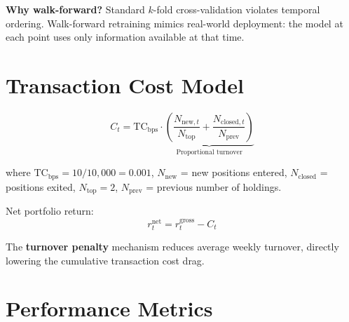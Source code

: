 \documentclass[12pt,a4paper]{article}
\begin{document}
\textbf{Why walk-forward?} Standard $k$-fold cross-validation violates temporal ordering. Walk-forward retraining mimics real-world deployment: the model at each point uses only information available at that time.

\section{Transaction Cost Model}

\begin{equation}
    C_t = \text{TC}_{\text{bps}} \cdot \underbrace{\left(\frac{N_{\text{new},t}}{N_{\text{top}}} + \frac{N_{\text{closed},t}}{N_{\text{prev}}}\right)}_{\text{Proportional turnover}}
\end{equation}

where $\text{TC}_{\text{bps}} = 10/10{,}000 = 0.001$, $N_{\text{new}}$ = new positions entered, $N_{\text{closed}}$ = positions exited, $N_{\text{top}} = 2$, $N_{\text{prev}}$ = previous number of holdings.

Net portfolio return:
\begin{equation}
    r_t^{\text{net}} = r_t^{\text{gross}} - C_t
\end{equation}

The \textbf{turnover penalty} mechanism reduces average weekly turnover, directly lowering the cumulative transaction cost drag.

\section{Performance Metrics}
\end{document}
